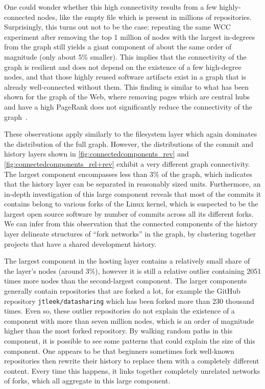 One could wonder whether this high connectivity results from a few
highly-connected nodes, like the empty file which is present in millions of
repositories.  Surprisingly, this turns out not to be the case: repeating the
same WCC experiment after removing the top 1 million of nodes with the largest
in-degrees from the graph still yields a giant component of about the same order
of magnitude (only about 5\% smaller). This implies that the connectivity of
the graph is resilient and does not depend on the existence of a few
high-degree nodes, and that those highly reused software artifacts exist in a
graph that is already well-connected without them.
This finding is similar to what has been shown for the graph of the Web, where
removing pages which are central hubs and have a high PageRank does not
significantly reduce the connectivity of the graph~\cite{broder2000graph}.

These observations apply similarly to the filesystem layer which again
dominates the distribution of the full graph. However, the distributions of the
commit and history layers shown in
\cref{fig:connectedcomponents_rev} and \cref{fig:connectedcomponents_rel+rev}
exhibit a very different graph connectivity. The largest component encompasses
less than 3\% of the graph, which indicates that the history layer can be
separated in reasonably sized units.
Furthermore, an in-depth investigation of this large component reveals that
most of the commits it contains belong to various forks of the Linux kernel,
which is suspected to be the largest open source software by number of commits
across all its different forks. We can infer from this observation that the
connected components of the history layer delineate structures of ``fork
networks'' in the graph, by clustering together projects that have a shared
development history.

The largest component in the hosting layer contains a relatively small share of
the layer's nodes (around 3\%), however it is still a relative outlier
containing 2051 times more nodes than the second-largest component. The larger
components generally contain repositories that are forked a lot, for example
the GitHub repository \texttt{jtleek/datasharing} which has been forked more
than 230 thousand times.  Even so, these outlier repositories do not explain
the existence of a component with more than seven million nodes, which is an
order of magnitude higher than the most forked repository. By walking random
paths in this component, it is possible to see some patterns that could explain
the size of this component.  One appears to be that beginners sometimes fork
well-known repositories then rewrite their history to replace them with a
completely different content.  Every time this happens, it links together
completely unrelated networks of forks, which all aggregate in this large
component.

